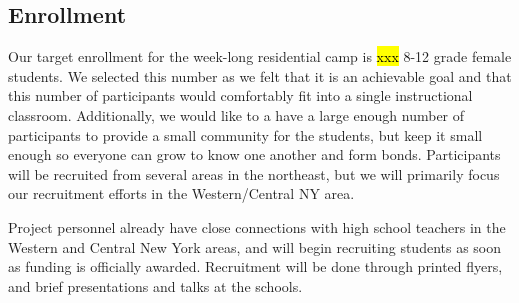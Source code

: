 \documentclass[12pt]{article}
\begin{document}


\subsection{Enrollment}

Our target enrollment for the week-long residential camp is \hl{xxx} 8-12 grade female students. We selected this number as we felt that it is an achievable goal and that this number of participants would comfortably fit into a single instructional classroom. Additionally, we would like to a have a large enough number of participants to provide a small community for the students, but keep it small enough so everyone can grow to know one another and form bonds. Participants will be recruited from several areas in the northeast, but we will primarily focus our recruitment efforts in the Western/Central NY area. 

Project personnel already have close connections with high school teachers in the Western and Central New York areas, and will begin recruiting students as soon as funding is officially awarded. Recruitment will be done through printed flyers, and brief presentations and talks at the schools. 
\end{document}
